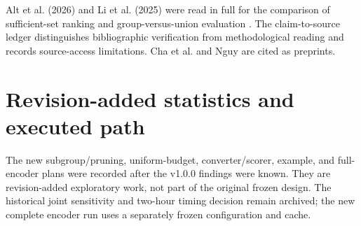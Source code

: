 \documentclass[twoside,a4paper,11pt]{article}
\begin{document}
Alt et al. (2026) and Li et al. (2025) were read in full for the comparison of sufficient-set ranking and group-versus-union evaluation \citep{alt2026,li2025}. The claim-to-source ledger distinguishes bibliographic verification from methodological reading and records source-access limitations. Cha et al. and Nguy are cited as preprints.


\section{Revision-added statistics and executed path}
The new subgroup/pruning, uniform-budget, converter/scorer, example, and full-encoder plans were recorded after the v1.0.0 findings were known. They are revision-added exploratory work, not part of the original frozen design. The historical joint sensitivity and two-hour timing decision remain archived; the new complete encoder run uses a separately frozen configuration and cache.
\end{document}
